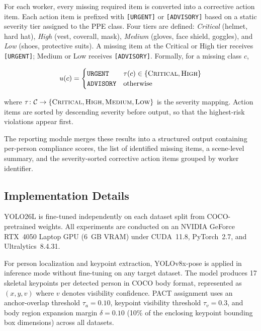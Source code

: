 \documentclass[conference,a4paper]{IEEEtran}
\begin{document}
For each worker, every missing required item is converted into a corrective action item.  Each action item is prefixed with \texttt{[URGENT]} or \texttt{[ADVISORY]} based on a static severity tier assigned to the PPE class.  Four tiers are defined: \textit{Critical} (helmet, hard hat), \textit{High} (vest, coverall, mask), \textit{Medium} (gloves, face shield, goggles), and \textit{Low} (shoes, protective suits).  A missing item at the Critical or High tier receives \texttt{[URGENT]}; Medium or Low receives \texttt{[ADVISORY]}.  Formally, for a missing class $c$,

\begin{equation}
u(c) =
\begin{cases}
\texttt{URGENT}   & \tau(c) \in \{\textsc{Critical}, \textsc{High}\} \\
\texttt{ADVISORY} & \text{otherwise}
\end{cases}
\end{equation}

where $\tau\colon \mathcal{C} \to \{\textsc{Critical}, \textsc{High}, \textsc{Medium}, \textsc{Low}\}$ is the severity mapping.  Action items are sorted by descending severity before output, so that the highest-risk violations appear first.

The reporting module merges these results into a structured output containing per-person compliance scores, the list of identified missing items, a scene-level summary, and the severity-sorted corrective action items grouped by worker identifier.


\subsection{Implementation Details}
YOLO26L is fine-tuned independently on each dataset split from COCO-pretrained weights. All experiments are conducted on an NVIDIA GeForce RTX~4050 Laptop GPU (6~GB VRAM) under CUDA~11.8, PyTorch~2.7, and Ultralytics~8.4.31.

For person localization and keypoint extraction, YOLOv8x-pose is applied in inference mode without fine-tuning on any target dataset. The model produces 17 skeletal keypoints per detected person in COCO body format, represented as $(x, y, v)$ where $v$ denotes visibility confidence. PACT assignment uses an anchor-overlap threshold $\tau_a = 0.10$, keypoint visibility threshold $\tau_v = 0.3$, and body region expansion margin $\delta = 0.10$ (10\% of the enclosing keypoint bounding box dimensions) across all datasets.
\end{document}
